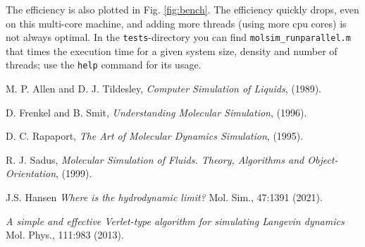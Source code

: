 \documentclass[11pt]{article}
\begin{document}
The efficiency is also plotted in Fig. \ref{fig:bench}. The efficiency quickly
drops, even on this multi-core machine, and adding more threads (using more cpu
cores) is not always optimal. In the \verb!tests!-directory you can find
\verb!molsim_runparallel.m! that times the execution time for a given system
size, density and number of threads; use the \verb!help! command for its usage.

\clearpage

\begin{thebibliography}{9}

  M. P. Allen and D. J. Tildesley, \emph{Computer Simulation of Liquids}, (1989). 

  D. Frenkel and B. Smit, \emph{Understanding Molecular Simulation}, (1996).

 D. C. Rapaport, \emph{The Art of Molecular Dynamics Simulation}, (1995).

  R. J. Sadus, \emph{Molecular Simulation of Fluids. Theory, Algorithms and
    Object-Orientation}, (1999).

  J.S. Hansen \emph{Where is the hydrodynamic limit?} Mol. Sim., 47:1391 (2021).
 
   \emph{A simple and effective Verlet-type algorithm for simulating Langevin dynamics} 
   Mol. Phys., 111:983 (2013).
  
\end{thebibliography}

\appendix

\clearpage
\end{document}
